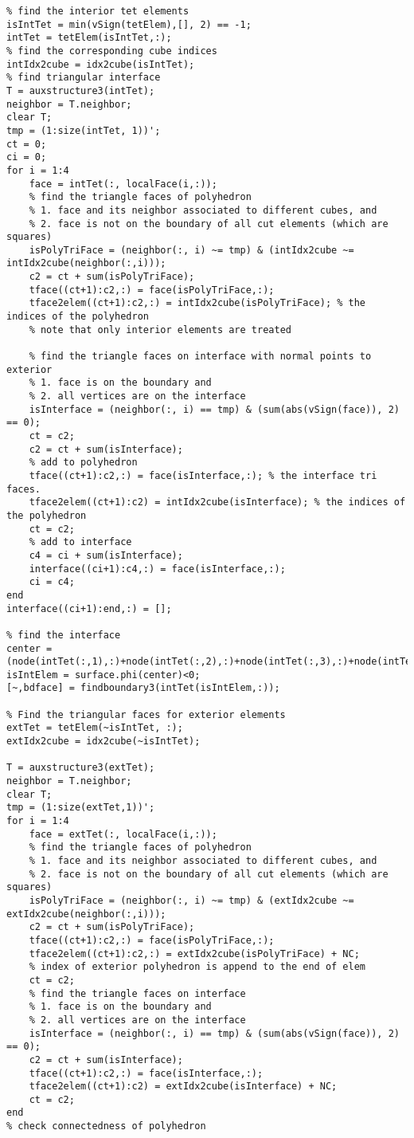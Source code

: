\documentclass[12pt]{article}
\begin{document}
\begin{lstlisting}
% find the interior tet elements
isIntTet = min(vSign(tetElem),[], 2) == -1;
intTet = tetElem(isIntTet,:);
% find the corresponding cube indices
intIdx2cube = idx2cube(isIntTet); 
% find triangular interface
T = auxstructure3(intTet);
neighbor = T.neighbor;
clear T;
tmp = (1:size(intTet, 1))';
ct = 0;
ci = 0;
for i = 1:4
    face = intTet(:, localFace(i,:));
    % find the triangle faces of polyhedron
    % 1. face and its neighbor associated to different cubes, and
    % 2. face is not on the boundary of all cut elements (which are squares)
    isPolyTriFace = (neighbor(:, i) ~= tmp) & (intIdx2cube ~= intIdx2cube(neighbor(:,i)));
    c2 = ct + sum(isPolyTriFace);
    tface((ct+1):c2,:) = face(isPolyTriFace,:);
    tface2elem((ct+1):c2,:) = intIdx2cube(isPolyTriFace); % the indices of the polyhedron
    % note that only interior elements are treated
    
    % find the triangle faces on interface with normal points to exterior
    % 1. face is on the boundary and
    % 2. all vertices are on the interface
    isInterface = (neighbor(:, i) == tmp) & (sum(abs(vSign(face)), 2) == 0);
    ct = c2;
    c2 = ct + sum(isInterface);
    % add to polyhedron
    tface((ct+1):c2,:) = face(isInterface,:); % the interface tri faces.
    tface2elem((ct+1):c2) = intIdx2cube(isInterface); % the indices of the polyhedron
    ct = c2;
    % add to interface    
    c4 = ci + sum(isInterface);
    interface((ci+1):c4,:) = face(isInterface,:);
    ci = c4;
end
interface((ci+1):end,:) = [];

% find the interface 
center = (node(intTet(:,1),:)+node(intTet(:,2),:)+node(intTet(:,3),:)+node(intTet(:,4),:))/4;
isIntElem = surface.phi(center)<0;
[~,bdface] = findboundary3(intTet(isIntElem,:));

% Find the triangular faces for exterior elements 
extTet = tetElem(~isIntTet, :);
extIdx2cube = idx2cube(~isIntTet);

T = auxstructure3(extTet);
neighbor = T.neighbor;
clear T;
tmp = (1:size(extTet,1))';
for i = 1:4
    face = extTet(:, localFace(i,:));
    % find the triangle faces of polyhedron
    % 1. face and its neighbor associated to different cubes, and
    % 2. face is not on the boundary of all cut elements (which are squares)
    isPolyTriFace = (neighbor(:, i) ~= tmp) & (extIdx2cube ~= extIdx2cube(neighbor(:,i)));
    c2 = ct + sum(isPolyTriFace);
    tface((ct+1):c2,:) = face(isPolyTriFace,:);
    tface2elem((ct+1):c2,:) = extIdx2cube(isPolyTriFace) + NC; 
    % index of exterior polyhedron is append to the end of elem
    ct = c2;
    % find the triangle faces on interface
    % 1. face is on the boundary and
    % 2. all vertices are on the interface
    isInterface = (neighbor(:, i) == tmp) & (sum(abs(vSign(face)), 2) == 0);    
    c2 = ct + sum(isInterface);
    tface((ct+1):c2,:) = face(isInterface,:);
    tface2elem((ct+1):c2) = extIdx2cube(isInterface) + NC;
    ct = c2;
end
% check connectedness of polyhedron


\end{lstlisting}
\end{document}
